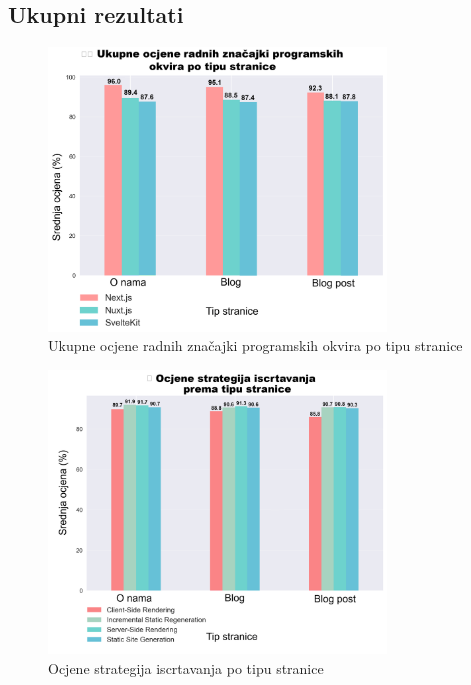 \subsection{Ukupni rezultati}

\begin{figure}[H]
    \centering
    \includegraphics[width=0.8\textwidth]{slike/rezultati/ukupno/framework_across_pages.png}
    \caption{Ukupne ocjene radnih značajki programskih okvira po tipu stranice}
    \label{fig:ukupne_ocjene_radnih_znacajki}
\end{figure}

\begin{figure}[H]
    \centering
    \includegraphics[width=0.8\textwidth]{slike/rezultati/ukupno/strategy_across_pages.png}
    \caption{Ocjene strategija iscrtavanja po tipu stranice}
    \label{fig:ukupne_ocjene_strategija_iscrtavanja}
\end{figure}

